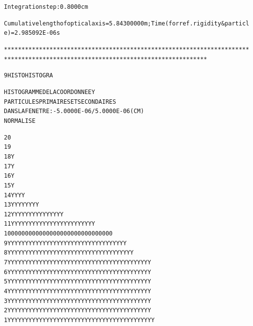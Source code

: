 \begin{tiny}
\begin{center}
\begin{alltt}
                    Integration step :  0.8000     cm

 Cumulative length of optical axis =    5.84300000     m ;  Time  (for ref. rigidity & particle) =   2.985092E-06 s 

********************************************************************************************************************************
\end{alltt}
\clearpage
\begin{alltt}
      9  HISTO     HISTOGRA          

                              HISTOGRAMME  DE  LA  COORDONNEE  Y    
                              PARTICULES  PRIMAIRES  ET  SECONDAIRES
                              DANS  LA  FENETRE :  -5.0000E-06 /   5.0000E-06 (CM) 
                              NORMALISE     

   20                                                                                      
   19                                                                                      
   18                                                    Y                                 
   17                                                    Y                                 
   16                                                    Y                                 
   15                                                    Y                                 
   14                                                  YYY     Y                           
   13                                               Y  YYY    YY YY                        
   12                                               YYYYYY YYYYYYYY             Y          
   11                                   Y  Y      Y YYYYYYYYYYYYYYYYY  YY    Y  Y          
   10                                   0  0   00000000000000000000000 00    0  0          
    9                                   Y YYYY YYYYYYYYYYYYYYYYYYYYYYYYYY    Y YY          
    8                                   Y YYYY YYYYYYYYYYYYYYYYYYYYYYYYYYYY  Y YY          
    7                                   YYYYYYYYYYYYYYYYYYYYYYYYYYYYYYYYYYYYYYYYY          
    6                                   YYYYYYYYYYYYYYYYYYYYYYYYYYYYYYYYYYYYYYYYY          
    5                                   YYYYYYYYYYYYYYYYYYYYYYYYYYYYYYYYYYYYYYYYY          
    4                                   YYYYYYYYYYYYYYYYYYYYYYYYYYYYYYYYYYYYYYYYY          
    3                                   YYYYYYYYYYYYYYYYYYYYYYYYYYYYYYYYYYYYYYYYY          
    2                                   YYYYYYYYYYYYYYYYYYYYYYYYYYYYYYYYYYYYYYYYY          
    1                                  YYYYYYYYYYYYYYYYYYYYYYYYYYYYYYYYYYYYYYYYYY          


\end{alltt}
\end{center}
\end{tiny}
